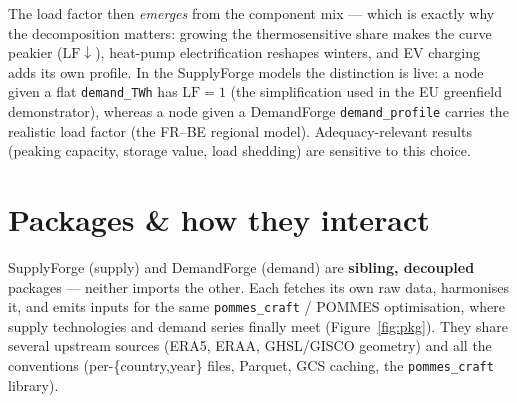 \documentclass[11pt,a4paper]{article}
\begin{document}
The load factor then \emph{emerges} from the component mix --- which is exactly why the decomposition
matters: growing the thermosensitive share makes the curve peakier ($\mathrm{LF}\downarrow$), heat-pump
electrification reshapes winters, and EV charging adds its own profile. In the SupplyForge models the
distinction is live: a node given a flat \texttt{demand\_TWh} has $\mathrm{LF}=1$ (the simplification
used in the EU greenfield demonstrator), whereas a node given a DemandForge \texttt{demand\_profile}
carries the realistic load factor (the FR--BE regional model). Adequacy-relevant results (peaking
capacity, storage value, load shedding) are sensitive to this choice.

\section{Packages \& how they interact}
SupplyForge (supply) and DemandForge (demand) are \textbf{sibling, decoupled} packages --- neither imports
the other. Each fetches its own raw data, harmonises it, and emits inputs for the same
\texttt{pommes\_craft} / POMMES optimisation, where supply technologies and demand series finally meet
(Figure~\ref{fig:pkg}). They share several upstream sources (ERA5, ERAA, GHSL/GISCO geometry) and all the
conventions (per-\{country,year\} files, Parquet, GCS caching, the \texttt{pommes\_craft} library).
\end{document}
